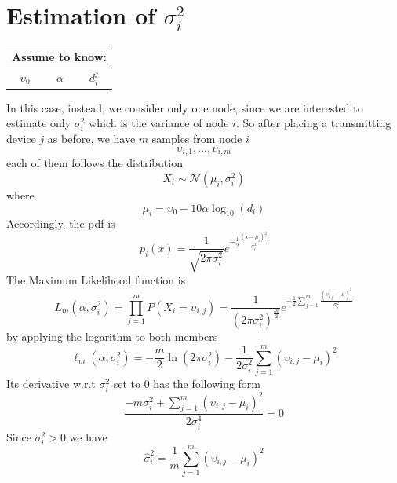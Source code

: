\documentclass[12pt]{report}
\begin{document}
\section{Estimation of $\sigma^2_i$}
\begin{center}
    \begin{tabular}{ |c|c|c| } 
    \hline
    \multicolumn{3}{|c|}{ \textbf{Assume to know:} } \\
    \hline
    $\upsilon_0$ & $\alpha$ &$d_i^j$ \\
    \hline
    \end{tabular}
\end{center}
In this case, instead, we consider only one node, since we are interested to estimate only $\sigma^2_i$ which is the variance of node $i$.
So after placing a transmitting device $j$ as before, we have $m$ samples from node $i$ $$\upsilon_{i,1},...,\upsilon_{i,m}$$ each of them follows the distribution
\begin{equation}
    X_i\sim \mathcal{N}(\mu_i,\sigma^2_i)
    \label{eq:24}
\end{equation}
where
\begin{equation}
    \mu_i = \upsilon_0-10\alpha\log_{10}(d_i)
\end{equation}
Accordingly, the pdf is
\begin{equation}
    p_{i}(x)=\frac{1}{\sqrt{2\pi\sigma_i^2}}e^{-\frac{1}{2}\frac{(x-\mu_i)^2}{\sigma^2_i}}
\end{equation}
The Maximum Likelihood function is
\begin{equation}
    L_m(\alpha,\sigma_i^2)=\prod_{j=1}^mP(X_i=\upsilon_{i,j})=
    \frac{1}{(2\pi\sigma_i^2)^{\frac{m}{2}}}e^{-\frac{1}{2}\sum_{j=1}^m\frac{(\upsilon_{i,j}-\mu_i)^2}{\sigma^2_i}}
\end{equation}
by applying the logarithm to both members
\begin{equation}
    \ell_m(\alpha,\sigma^2_i)=-\frac{m}{2}\ln(2\pi\sigma^2_i)-\frac{1}{2\sigma^2_i}\sum_{j=1}^m(\upsilon_{i,j}-\mu_i)^2
\end{equation}
Its derivative w.r.t $\sigma^2_i$ set to $0$ has the following form 
\begin{equation}
    \frac{-m\sigma^2_i+\sum_{j=1}^m(\upsilon_{i,j}-\mu_i)^2}{2\sigma^4_i}=0
\end{equation}
Since $\sigma^2_i>0$ we have
\begin{equation}
    \hat{\sigma}^2_i=\frac{1}{m}\sum_{j=1}^m(\upsilon_{i,j}-\mu_i)^2
\end{equation}
\end{document}
